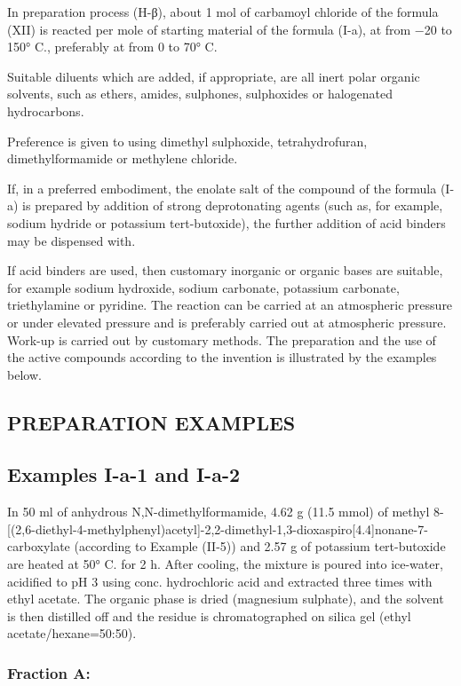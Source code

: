 \documentclass[11pt,a4paper]{article}
\begin{document}
In preparation process (H-β), about 1 mol of carbamoyl chloride of the formula (XII) is reacted per mole of starting material of the formula (I-a), at from −20 to 150° C., preferably at from 0 to 70° C.

Suitable diluents which are added, if appropriate, are all inert polar organic solvents, such as ethers, amides, sulphones, sulphoxides or halogenated hydrocarbons.

Preference is given to using dimethyl sulphoxide, tetrahydrofuran, dimethylformamide or methylene chloride.

If, in a preferred embodiment, the enolate salt of the compound of the formula (I-a) is prepared by addition of strong deprotonating agents (such as, for example, sodium hydride or potassium tert-butoxide), the further addition of acid binders may be dispensed with.

If acid binders are used, then customary inorganic or organic bases are suitable, for example sodium hydroxide, sodium carbonate, potassium carbonate, triethylamine or pyridine. The reaction can be carried at an atmospheric pressure or under elevated pressure and is preferably carried out at atmospheric pressure. Work-up is carried out by customary methods. The preparation and the use of the active compounds according to the invention is illustrated by the examples below.

\subsection{PREPARATION EXAMPLES}

\subsection{Examples I-a-1 and I-a-2}

In 50 ml of anhydrous N,N-dimethylformamide, 4.62 g (11.5 mmol) of methyl 8-[(2,6-diethyl-4-methylphenyl)acetyl]-2,2-dimethyl-1,3-dioxaspiro[4.4]nonane-7-carboxylate (according to Example (II-5)) and 2.57 g of potassium tert-butoxide are heated at 50° C. for 2 h. After cooling, the mixture is poured into ice-water, acidified to pH 3 using conc. hydrochloric acid and extracted three times with ethyl acetate. The organic phase is dried (magnesium sulphate), and the solvent is then distilled off and the residue is chromatographed on silica gel (ethyl acetate/hexane=50:50).

\subsubsection{Fraction A:}
\end{document}
